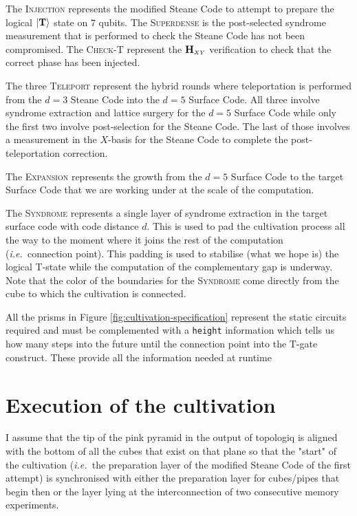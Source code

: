 \documentclass{article}
\newcommand{\ie}{{\it i.e.~}}
\newcommand{\Op}[1]{{\bf #1}}
\begin{document}
	The \textsc{Injection} represents the modified Steane Code to attempt to prepare the logical $\ket{\Op{T}}$ state on $7$ qubits. The \textsc{Superdense} is the post-selected syndrome measurement that is performed to check the Steane Code has not been compromised. The \textsc{Check-T} represent the $\Op{H}_{\scriptscriptstyle XY}$ verification to check that the correct phase has been injected.
	
	The three \textsc{Teleport} represent the hybrid rounds where teleportation is performed from the $d=3$ Steane Code into the $d=5$ Surface Code. All three involve syndrome extraction and lattice surgery for the $d=5$ Surface Code while only the first two involve post-selection for the Steane Code. The last of those involves a measurement in the $X$-basis for the Steane Code to complete the post-teleportation correction.

	The \textsc{Expansion} represents the growth from the $d=5$ Surface Code to the target Surface Code that we are working under at the scale of the computation.

	The \textsc{Syndrome} represents a single layer of syndrome extraction in the target surface code with code distance $d$. This is used to pad the cultivation process all the way to the moment where it joins the rest of the computation (\ie connection point). This padding is used to stabilise (what we hope is) the logical T-state while the computation of the complementary gap is underway. Note that the color of the boundaries for the \textsc{Syndrome} come directly from the cube to which the cultivation is connected.

	All the prisms in Figure \ref{fig:cultivation-specification} represent the static circuits required and must be complemented with a {\tt height} information which tells us how many steps into the future until the connection point into the T-gate construct. These provide all the information needed at runtime 

	\section{Execution of the cultivation}

	I assume that the tip of the pink pyramid in the output of topologiq is aligned with the bottom of all the cubes  that exist on that plane so that the "start" of the cultivation (\ie the preparation layer of the modified Steane Code of the first attempt) is synchronised with either the preparation layer for cubes/pipes that begin then or the layer lying at the interconnection of two consecutive memory experiments.
\end{document}
